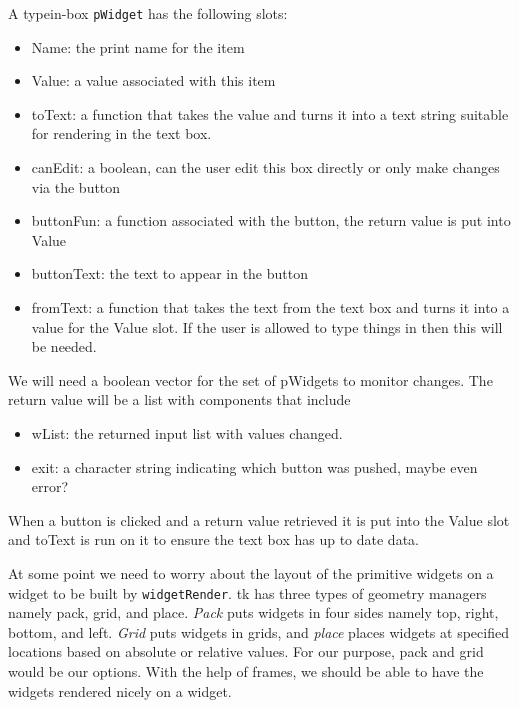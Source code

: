 \documentclass{article}
\begin{document}
A typein-box \verb+pWidget+ has the following slots:
\begin{itemize}
\item Name: the print name for the item
\item Value: a value associated with this item
\item toText: a function that takes the value and turns it into a text
  string suitable for rendering in the text box.
\item canEdit: a boolean, can the user edit this box directly or only
  make changes via the button
\item buttonFun: a function associated with the button, the return
  value is put into Value
\item buttonText: the text to appear in the button
\item fromText: a function that takes the text from the text box and
  turns it into a value for the Value slot. If the user is allowed to
  type things in then this will be needed.
\end{itemize}


We will need a boolean vector for the set of pWidgets to monitor
changes. The return value will be a list with components that include
\begin{itemize}
\item wList: the returned input list with values changed.
\item exit: a character string indicating which button was pushed,
  maybe even error?
\end{itemize}

When a button is clicked and a return value retrieved it is put into
the Value slot and toText is run on it to ensure the text box has up
to date data.

At some point we need to worry about the layout of the primitive
widgets on a widget to be built by \verb+widgetRender+. tk has three
types of geometry managers namely pack, grid, and place. {\em Pack} puts
widgets in four sides namely top, right, bottom, and left. {\em Grid} puts
widgets in grids, and {\em place} places widgets at specified locations
based on absolute or relative values. For our purpose, pack and grid
would be our options. With the help of frames, we should be able to
have the widgets rendered nicely on a widget.

\end{document}
